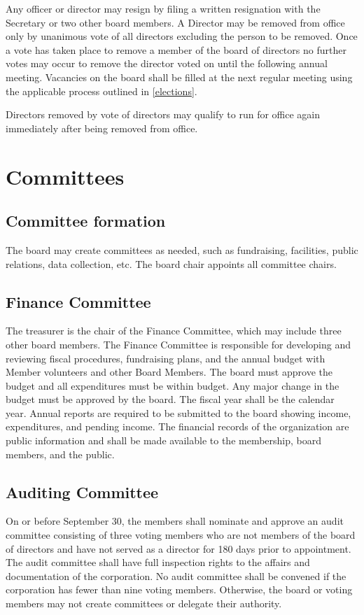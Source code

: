 \documentclass[10pt,letterpaper,titlepage]{article}
\begin{document}
Any officer or director may resign by filing a written resignation with the
Secretary or two other board members.
A Director may be removed from office only by unanimous vote of all directors
excluding the person to be removed.
Once a vote has taken place to remove a member of the board of directors no
further votes may occur to remove the director voted on until the following
annual meeting.
Vacancies on the board shall be filled at the next regular meeting using the
applicable process outlined in \ref{elections}.

Directors removed by vote of directors may qualify to run for office again
immediately after being removed from office.

\section{Committees}

\subsection{Committee formation}

The board may create committees as needed, such as fundraising, facilities,
public relations, data collection, etc.
The board chair appoints all committee chairs.

\subsection{Finance Committee}

The treasurer is the chair of the Finance Committee, which may include three
other board members.
The Finance Committee is responsible for developing and reviewing fiscal
procedures, fundraising plans, and the annual budget with Member volunteers and
other Board Members.
The board must approve the budget and all expenditures must be within budget.
Any major change in the budget must be approved by the board.
The fiscal year shall be the calendar year.
Annual reports are required to be submitted to the board showing income,
expenditures, and pending income.
The financial records of the organization are public information and shall be
made available to the membership, board members, and the public.

\subsection{Auditing Committee}

On or before September 30, the members shall nominate and approve an audit
committee consisting of three voting members who are not members of the board
of directors and have not served as a director for 180 days prior to
appointment.
The audit committee shall have full inspection rights to the affairs and
documentation of the corporation.
No audit committee shall be convened if the corporation has fewer than nine
voting members.
Otherwise, the board or voting members may not create committees or delegate
their authority.
\end{document}
